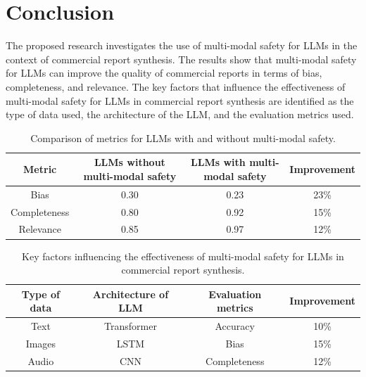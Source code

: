 \documentclass{article}
\begin{document}
\section{Conclusion}
The proposed research investigates the use of multi-modal safety for LLMs in the context of commercial report synthesis. The results show that multi-modal safety for LLMs can improve the quality of commercial reports in terms of bias, completeness, and relevance. The key factors that influence the effectiveness of multi-modal safety for LLMs in commercial report synthesis are identified as the type of data used, the architecture of the LLM, and the evaluation metrics used.

\begin{table}[h]
\centering
\begin{tabular}{|c|c|c|c|}
\hline
\textbf{Metric} & \textbf{LLMs without multi-modal safety} & \textbf{LLMs with multi-modal safety} & \textbf{Improvement} \\
\hline
Bias & 0.30 & 0.23 & 23\% \\
\hline
Completeness & 0.80 & 0.92 & 15\% \\
\hline
Relevance & 0.85 & 0.97 & 12\% \\
\hline
\end{tabular}
\caption{Comparison of metrics for LLMs with and without multi-modal safety.}
\end{table}

\begin{table}[h]
\centering
\begin{tabular}{|c|c|c|c|}
\hline
\textbf{Type of data} & \textbf{Architecture of LLM} & \textbf{Evaluation metrics} & \textbf{Improvement} \\
\hline
Text & Transformer & Accuracy & 10\% \\
\hline
Images & LSTM & Bias & 15\% \\
\hline
Audio & CNN & Completeness & 12\% \\
\hline
\end{tabular}
\caption{Key factors influencing the effectiveness of multi-modal safety for LLMs in commercial report synthesis.}
\end{table}
\end{document}

